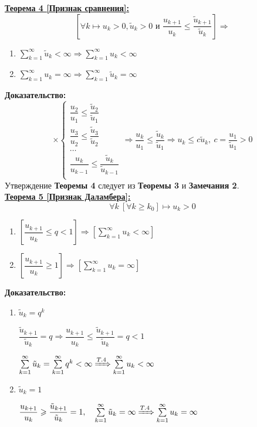 \documentclass[a4paper,12pt]{article} %
\newcommand{\series}{\sum\limits_{k=1}^{\infty}}
\newcommand{\useriesl}{\sum\limits_{k=1}^{\infty} u_k < \infty}
\newcommand{\useriese}{\sum\limits_{k=1}^{\infty} u_k = \infty}
\begin{document}
\underline{\textbf{Теорема 4 [Признак сравнения]:}}
$$\left[ \forall k \mapsto u_k > 0, \tilde{u}_k > 0 \text{ и } \dfrac{u_{k+1}}{u_k} \leqslant \dfrac{\tilde{u}_{k+1}}{\tilde{u}_k} \right] \Rightarrow$$
\begin{enumerate}
	\item $\series \tilde{u}_k < \infty \Rightarrow \useriesl$
	\item $\useriese \Rightarrow \series \tilde{u}_k = \infty$
\end{enumerate}
\textbf{Доказательство:}
\begin{equation*}
	\times
	\begin{cases}
		\dfrac{u_2}{u_1} \leqslant \dfrac{\tilde{u}_2}{\tilde{u}_1} \\
		\dfrac{u_3}{u_2} \leqslant \dfrac{\tilde{u}_3}{\tilde{u}_2} \\
		\dots \\
		\dfrac{u_k}{u_{k-1}} \leqslant \dfrac{\tilde{u}_k}{\tilde{u}_{k-1}} \\
	\end{cases}
	\Rightarrow \dfrac{u_k}{u_1} \leqslant \dfrac{\tilde{u}_k}{\tilde{u}_1} \Rightarrow u_k \leqslant c\tilde{u}_k, ~c = \dfrac{u_1}{\tilde{u}_1} > 0
\end{equation*}
Утверждение \textbf{Теоремы 4} следует из \textbf{Теоремы 3} и \textbf{Замечания 2}.\\
\underline{\textbf{Теорема 5 [Признак Даламбера]:}}
$$\forall k \ [\forall k \geqslant k_0] \mapsto u_k > 0$$
\begin{enumerate}
	\item $ \left[ \dfrac{u_{k+1}}{u_k} \leqslant q < 1 \right] \Rightarrow \left[ \useriesl \right]$
	\item $ \left[ \dfrac{u_{k+1}}{u_k} \geqslant 1 \right] \Rightarrow \left[ \useriese \right]$
\end{enumerate}
\textbf{Доказательство:}
\begin{enumerate}
	\item $\tilde{u}_k = q^k$
	
	$\dfrac{\tilde{u}_{k+1}}{\tilde{u}_k} = q \Rightarrow \dfrac{u_{k+1}}{u_k} \leqslant \dfrac{\tilde{u}_{k+1}}{\tilde{u}_k} = q < 1$
	
	$\series \tilde{u}_k = \series q^k < \infty \xRightarrow{T.4} \useriesl$
	\item $\tilde{u}_k = 1$
	
	$\dfrac{u_{k+1}}{u_k} \geqslant \dfrac{\tilde{u}_{k+1}}{\tilde{u}_k} = 1, \hspace{1em} \series \tilde{u}_k = \infty \xRightarrow[]{T.4} \useriese$
\end{enumerate}
\end{document}
